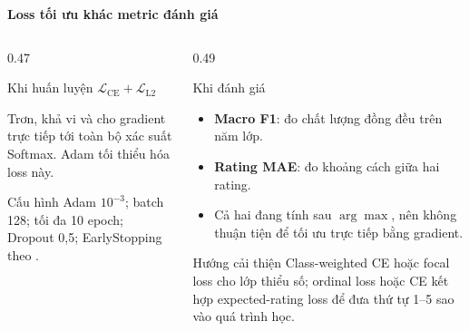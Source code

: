 \documentclass[aspectratio=169]{beamer}
\newcommand{\codeword}[1]{\texttt{\detokenize{#1}}}
\begin{document}
\begin{frame}{\textbf{\large Loss tối ưu khác metric đánh giá}}
    \begin{columns}[T,onlytextwidth]
        \begin{column}{0.47\textwidth}
            \begin{block}{Khi huấn luyện}
                \centering
                $\mathcal L_{\mathrm{CE}}+\mathcal L_{\mathrm{L2}}$

                \vspace{0.18cm}
                \raggedright
                Trơn, khả vi và cho gradient trực tiếp tới toàn bộ xác suất
                Softmax. Adam tối thiểu hóa loss này.
            \end{block}

            \begin{block}{Cấu hình}
                \small
                Adam $10^{-3}$; batch 128; tối đa 10 epoch; Dropout 0,5;
                EarlyStopping theo \codeword{val_loss}.
            \end{block}
        \end{column}

        \begin{column}{0.49\textwidth}
            \begin{alertblock}{Khi đánh giá}
                \begin{itemize}
                    \item \textbf{Macro F1}: đo chất lượng đồng đều trên năm lớp.
                    \item \textbf{Rating MAE}: đo khoảng cách giữa hai rating.
                    \item Cả hai đang tính sau $\arg\max$, nên không thuận tiện
                    để tối ưu trực tiếp bằng gradient.
                \end{itemize}
            \end{alertblock}

            \begin{exampleblock}{Hướng cải thiện}
                Class-weighted CE hoặc focal loss cho lớp thiểu số; ordinal loss
                hoặc CE kết hợp expected-rating loss để đưa thứ tự 1--5 sao vào
                quá trình học.
            \end{exampleblock}
        \end{column}
    \end{columns}
\end{frame}
\end{document}
